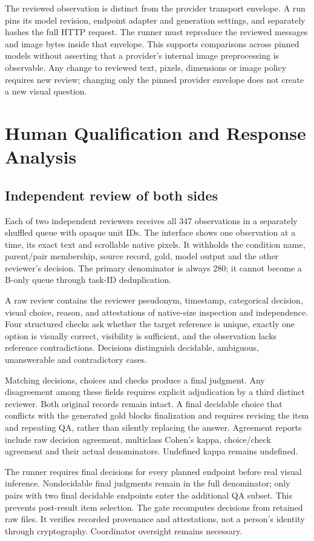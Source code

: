 \documentclass[10pt,twocolumn,letterpaper]{article}
\begin{document}
The reviewed observation is distinct from the provider transport
envelope. A run pins its model revision, endpoint adapter and generation
settings, and separately hashes the full HTTP request. The runner must
reproduce the reviewed messages and image bytes inside that envelope.
This supports comparisons across pinned models without asserting
that a provider's internal image preprocessing is observable. Any
change to reviewed text, pixels, dimensions or image policy requires
new review; changing only the pinned provider envelope does not create
a new visual question.

\section{Human Qualification and Response Analysis}
\subsection{Independent review of both sides}
Each of two independent reviewers receives all 347 observations in
a separately shuffled queue with opaque unit IDs. The interface
shows one observation at a time, its exact text and scrollable native
pixels. It withholds the condition name, parent/pair membership,
source record, gold, model output and the other reviewer's decision.
The primary denominator is always 280; it cannot become a B-only
queue through task-ID deduplication.

A raw review contains the reviewer pseudonym, timestamp, categorical
decision, visual choice, reason, and attestations of native-size
inspection and independence. Four structured checks ask whether
the target reference is unique, exactly one option is visually correct,
visibility is sufficient, and the observation lacks reference
contradictions. Decisions distinguish decidable, ambiguous,
unanswerable and contradictory cases.

Matching decisions, choices and checks produce a final judgment.
Any disagreement among these fields requires explicit adjudication
by a third distinct reviewer. Both original records remain intact.
A final decidable choice that conflicts with the generated gold blocks
finalization and requires revising the item and repeating QA, rather
than silently replacing the answer. Agreement reports include raw
decision agreement, multiclass Cohen's kappa, choice/check agreement
and their actual denominators. Undefined kappa remains undefined.

The runner requires final decisions for every planned endpoint before
real visual inference. Nondecidable final judgments remain in the full
denominator; only pairs with two final decidable endpoints enter the
additional QA subset. This prevents post-result item selection.
The gate recomputes decisions from retained raw files. It verifies
recorded provenance and attestations, not a person's identity through
cryptography. Coordinator oversight remains necessary.
\end{document}
